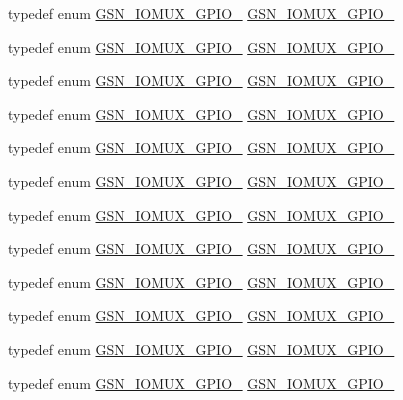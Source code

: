 \begin{DoxyCompactItemize}
\item 
typedef enum \hyperlink{a00519_a70a451f18789dc2260867a28da10688c}{GSN\_\-IOMUX\_\-GPIO\_} \hyperlink{a00519_a1b6cef94d5088455a2d30b3acfb02bac}{GSN\_\-IOMUX\_\-GPIO\_}
\item 
typedef enum \hyperlink{a00519_a2c5811def165aa4bef261dac58a7ae08}{GSN\_\-IOMUX\_\-GPIO\_} \hyperlink{a00519_acdba1a835885622726cd1b57711d5252}{GSN\_\-IOMUX\_\-GPIO\_}
\item 
typedef enum \hyperlink{a00519_ad659954601e98e1c08044b2365c23e49}{GSN\_\-IOMUX\_\-GPIO\_} \hyperlink{a00519_a2a72581749d870757a4a98d6baf38a99}{GSN\_\-IOMUX\_\-GPIO\_}
\item 
typedef enum \hyperlink{a00519_a1075add52e88940a7f4adf39833f85c4}{GSN\_\-IOMUX\_\-GPIO\_} \hyperlink{a00519_a3bf6d72a8c9b5f56ca46e529c3e13be3}{GSN\_\-IOMUX\_\-GPIO\_}
\item 
typedef enum \hyperlink{a00519_a90f5cd1f67094f859b76473c9184f580}{GSN\_\-IOMUX\_\-GPIO\_} \hyperlink{a00519_ac3e623082aac33b8590c2dc10ad03617}{GSN\_\-IOMUX\_\-GPIO\_}
\item 
typedef enum \hyperlink{a00519_a8918e3cd7c1af54b48633d283956507f}{GSN\_\-IOMUX\_\-GPIO\_} \hyperlink{a00519_ac43199a78717ff5fda5e09eb3e0063f3}{GSN\_\-IOMUX\_\-GPIO\_}
\item 
typedef enum \hyperlink{a00519_a47468174de6c5c56ca525f9cf4c08e75}{GSN\_\-IOMUX\_\-GPIO\_} \hyperlink{a00519_a254a634a55c4203918baf6f87ef13ea5}{GSN\_\-IOMUX\_\-GPIO\_}
\item 
typedef enum \hyperlink{a00519_ac07a70f0fad08cb5cef238bee66f366f}{GSN\_\-IOMUX\_\-GPIO\_} \hyperlink{a00519_ace4b0cde6bbd07c63d6828328f1b409d}{GSN\_\-IOMUX\_\-GPIO\_}
\item 
typedef enum \hyperlink{a00519_a73d55f0f6dc7bbde07bf7015041a813c}{GSN\_\-IOMUX\_\-GPIO\_} \hyperlink{a00519_a6a7f86bac9141fd8ffc1f2f25b1fdb96}{GSN\_\-IOMUX\_\-GPIO\_}
\item 
typedef enum \hyperlink{a00519_aaf45619e34942d75bfc7e204f9074436}{GSN\_\-IOMUX\_\-GPIO\_} \hyperlink{a00519_ad590c9b05da3e6e8dca217f41ea30455}{GSN\_\-IOMUX\_\-GPIO\_}
\item 
typedef enum \hyperlink{a00519_a86bd2b64215669b8a05236cfa417de58}{GSN\_\-IOMUX\_\-GPIO\_} \hyperlink{a00519_a14b09ce523bfd682501ec8c36edff27b}{GSN\_\-IOMUX\_\-GPIO\_}
\item 
typedef enum \hyperlink{a00519_aecca35d9cd508e28ee93f3be3ee7dd58}{GSN\_\-IOMUX\_\-GPIO\_} \hyperlink{a00519_ab6a22ac62d06b8c67c46d9441de07b39}{GSN\_\-IOMUX\_\-GPIO\_}

\end{DoxyCompactItemize}
